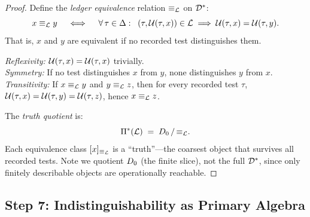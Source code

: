 \begin{proof}
Define the \emph{ledger equivalence} relation $\equiv_{\mathcal{L}}$ on $\mathcal{D}^*$:
\[
  x \equiv_{\mathcal{L}} y \quad\iff\quad
  \forall\, \tau \in \Delta:\;\;
    (\tau, \mathcal{U}(\tau, x)) \in \mathcal{L}
    \;\Longrightarrow\;
    \mathcal{U}(\tau, x) = \mathcal{U}(\tau, y).
\]
That is, $x$ and $y$ are equivalent if no recorded test distinguishes them.

\emph{Reflexivity:}  $\mathcal{U}(\tau, x) = \mathcal{U}(\tau, x)$ trivially. \\
\emph{Symmetry:}  If no test distinguishes $x$ from $y$, none distinguishes
$y$ from $x$. \\
\emph{Transitivity:}  If $x \equiv_{\mathcal{L}} y$ and $y \equiv_{\mathcal{L}} z$, then for every
recorded test $\tau$, $\mathcal{U}(\tau, x) = \mathcal{U}(\tau, y) = \mathcal{U}(\tau, z)$,
hence $x \equiv_{\mathcal{L}} z$.

The \emph{truth quotient} is:
\[
  \Pi^*(\mathcal{L}) \;=\; D_0 \,/\, {\equiv_{\mathcal{L}}}.
\]
Each equivalence class $[x]_{\equiv_{\mathcal{L}}}$ is a ``truth''---the coarsest
object that survives all recorded tests.  Note we quotient $D_0$
(the finite slice), not the full $\mathcal{D}^*$, since only finitely describable
objects are operationally reachable.

\end{proof}


\subsection{Step 7: Indistinguishability as Primary Algebra}\label{app:step7}

